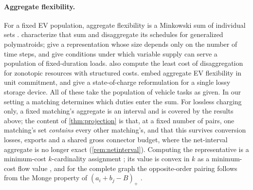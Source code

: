 
\paragraph{Aggregate flexibility.}
For a fixed EV population, aggregate flexibility is a Minkowski sum of
individual sets \citep{mukhiAbate2023exact,altaha2024flexibility}.
\citet[Thms.~3 and~7]{mukhiLohoAbate2025exact} characterize that sum and
disaggregate its schedules for generalized polymatroids;
\citet{pandaTindemans2024} give a representation whose size depends only on
the number of time steps, and \citet{nayyar2016duration} give conditions
under which variable supply can serve a population of fixed-duration loads.
\citet[Eqs.~(15)--(17)]{muller2019aggregation} also compute the least cost of
disaggregation for zonotopic resources with structured costs.
\citet{arvis2026aggregated} embed aggregate EV flexibility in unit commitment,
and \citet{altahaBitar2024lossy} give a state-of-charge reformulation for a
single lossy storage device. All of these take the population of vehicle
tasks as given. In our setting a matching determines which duties enter the
sum. For lossless charging only, a fixed matching's aggregate is an interval
and is covered by the results above; the content of
\cref{thm:projection} is that, at a fixed number of pairs, one matching's
set \emph{contains} every other matching's, and that this survives
conversion losses, exports and a shared gross connector budget, where the
net-interval aggregate is no longer exact (\cref{rem:netinterval}).
Computing the representative is a minimum-cost $k$-cardinality assignment
\citep{dellamicoMartello1997kcard}; its value is convex in $k$ as a
minimum-cost flow value \citep{murota2003dca}, and for the complete graph
the opposite-order pairing follows from the Monge property of
$(a_i+b_j-B)_+$ \citep{burkard1996monge}.

